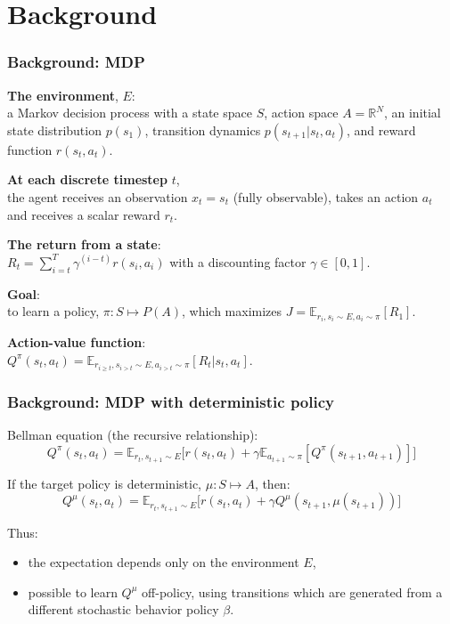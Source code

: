 \section{Background}

\begin{frame}
\frametitle{Background: MDP}
\textbf{The environment}, $E$: \\
a Markov decision process with a state space $S$, action space $A = \mathbb{R}^N$,
an initial state distribution $p(s_1)$, transition dynamics $p(s_{t+1}|s_t, a_t)$, and
reward function $r(s_t, a_t)$.
\vspace{2.5mm}

\textbf{At each discrete timestep} $t$, \\
the agent receives an observation $x_t = s_t$ (fully observable),
takes an action $a_t$ and receives a scalar reward $r_t$.
\vspace{2.5mm}

\textbf{The return from a state}: \\
$R_t= \sum_{i=t}^T  \gamma^{(i-t)} r(s_i, a_i)$ with a discounting factor $\gamma \in [0, 1]$.
\vspace{2.5mm}

\textbf{Goal}: \\
to learn a policy, $\pi: S \mapsto P(A)$, which
maximizes $J = \mathbb{E}_{r_i,s_i \sim E,a_i \sim \pi} [R_1]$.
\vspace{2.5mm}

\textbf{Action-value function}:\\
$Q^{\pi}(s_t,a_t) = \mathbb{E}_{r_{i \ge t},s_{i>t} \sim E,a_{i>t} \sim \pi} [R_t|s_t,a_t]$.
\end{frame}

\begin{frame}
\frametitle{Background: MDP with deterministic policy}
Bellman equation (the recursive relationship):
\begin{equation}
Q^{\pi} (s_t,a_t) = \mathbb{E}_{r_{t},s_{t+1} \sim E} \Big[ r(s_t,a_t) + \gamma \mathbb{E}_{a_{t+1} \sim \pi} [Q^{\pi}(s_{t+1},a_{t+1})] \Big]
\end{equation}

If the target policy is deterministic, $\mu: S \mapsto A$, then:
\begin{equation}
Q^{\mu} (s_t,a_t) = \mathbb{E}_{r_{t},s_{t+1} \sim E} \Big[ r(s_t,a_t) + \gamma Q^{\mu}(s_{t+1},\mu(s_{t+1})) \Big]
\end{equation}

Thus:
\begin{itemize}
\item the expectation depends only on the environment $E$,
\item possible to learn $Q^{\mu}$ off-policy, using transitions which
are generated from a different stochastic behavior policy $\beta$.
\end{itemize}
\end{frame}

